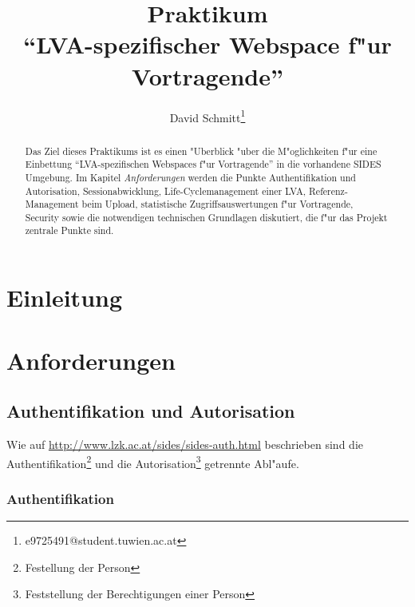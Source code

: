 \documentclass[12pt,a4paper]{article}
\title{Praktikum\\"`LVA-spezifischer Webspace f"ur Vortragende"'}
\author{David Schmitt\thanks{e9725491@student.tuwien.ac.at}}
\begin{document}
\maketitle

\vfill

\begin{abstract}

Das Ziel dieses Praktikums ist es einen "Uberblick "uber die M"oglichkeiten
f"ur eine Einbettung "`LVA-spezifischen Webspaces f"ur Vortragende"' in die
vorhandene SIDES Umgebung. Im Kapitel \textsl{Anforderungen} werden die
Punkte Authentifikation und Autorisation, Sessionabwicklung,
Life-Cyclemanagement einer LVA, Referenz-Management beim Upload,
statistische Zugriffsauswertungen f"ur Vortragende, Security sowie die
notwendigen technischen Grundlagen diskutiert, die f"ur das Projekt
zentrale Punkte sind.



\end{abstract}

\newpage

\tableofcontents

\newpage

\section{Einleitung}

\section{Anforderungen}
\subsection{Authentifikation und Autorisation}

Wie auf \url{http://www.lzk.ac.at/sides/sides-auth.html} beschrieben sind
die Authentifikation\footnote{Festellung der Person} und die
Autorisation\footnote{Feststellung der Berechtigungen einer Person}
getrennte Abl"aufe.

\subsubsection{Authentifikation}
\end{document}
